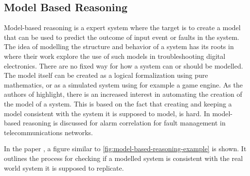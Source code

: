 \subsection{Model Based Reasoning}
Model-based reasoning is a expert system where the target is to create a model that can be used to predict the outcome of input event or faults in the system. The idea of modelling the structure and behavior of a system has its roots in \cite{davies_1987} where their work explore the use of such models in troubleshooting digital electronics.  There are no fixed way for how a system can or should be modelled. The model itself can be created as a logical formalization using pure mathematics, or as a simulated system using for example a game engine. As the authors of \cite{Dodig-Crnkovic2017} highlight, there is an increased interest in automating the creation of the model of a system. This is based on the fact that creating and keeping a model consistent with the system it is supposed to model, is hard.
In \cite{jakobson_1993} model-based reasoning is discussed for alarm correlation for fault management in telecommunications networks.

In the paper \cite{poll_2003}, a figure similar to \ref{fig:model-based-reasoning-example} is shown. It outlines the process for checking if a modelled system is consistent with the real world system it is supposed to replicate.

